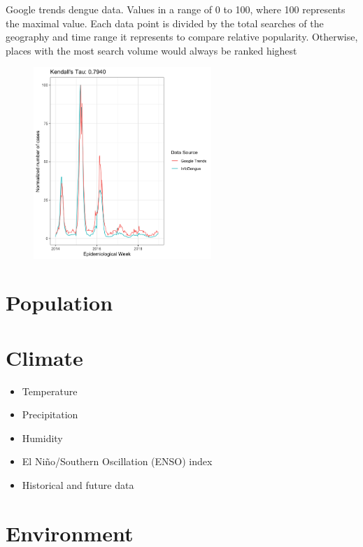 \documentclass[
  letterpaper,
  DIV=11,
  numbers=noendperiod]{scrreprt}
\providecommand{\tightlist}{%
  \setlength{\itemsep}{0pt}\setlength{\parskip}{0pt}}\usepackage{longtable,booktabs,array}
\begin{document}
Google trends dengue data. Values in a range of 0 to 100, where 100
represents the maximal value. Each data point is divided by the total
searches of the geography and time range it represents to compare
relative popularity. Otherwise, places with the most search volume would
always be ranked highest

\begin{figure}

{\centering \includegraphics[width=0.6\textwidth,height=\textheight]{img/denguebrazil-corrofficialgoogle.png}

}

\end{figure}

\hypertarget{population-1}{%
\section{Population}\label{population-1}}

\hypertarget{climate}{%
\section{Climate}\label{climate}}

\begin{itemize}
\tightlist
\item
  Temperature
\item
  Precipitation
\item
  Humidity
\item
  El Niño/Southern Oscillation (ENSO) index
\item
  Historical and future data
\end{itemize}

\hypertarget{environment-1}{%
\section{Environment}\label{environment-1}}
\end{document}
